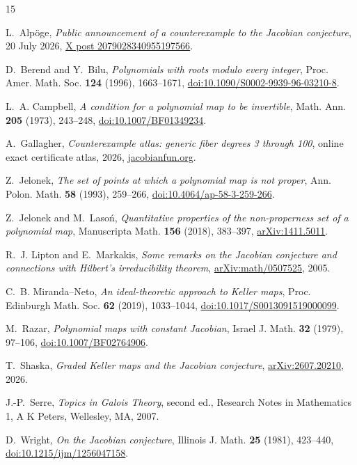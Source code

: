 \begin{thebibliography}{15}
\footnotesize
\setlength{\itemsep}{0pt}

L.~Alp\"oge,
\emph{Public announcement of a counterexample to the Jacobian conjecture},
20 July 2026,
\href{https://x.com/__alpoge__/status/2079028340955197566}
{X post 2079028340955197566}.

D.~Berend and Y.~Bilu,
\emph{Polynomials with roots modulo every integer},
Proc. Amer. Math. Soc. \textbf{124} (1996), 1663--1671,
\href{https://doi.org/10.1090/S0002-9939-96-03210-8}
{doi:10.1090/S0002-9939-96-03210-8}.

L.~A. Campbell,
\emph{A condition for a polynomial map to be invertible},
Math. Ann. \textbf{205} (1973), 243--248,
\href{https://doi.org/10.1007/BF01349234}
{doi:10.1007/BF01349234}.

A.~Gallagher,
\emph{Counterexample atlas: generic fiber degrees 3 through 100},
online exact certificate atlas, 2026,
\href{https://jacobianfun.org/counterexamples}{jacobianfun.org}.

Z.~Jelonek,
\emph{The set of points at which a polynomial map is not proper},
Ann. Polon. Math. \textbf{58} (1993), 259--266,
\href{https://doi.org/10.4064/ap-58-3-259-266}
{doi:10.4064/ap-58-3-259-266}.

Z.~Jelonek and M.~Laso\'n,
\emph{Quantitative properties of the non-properness set of a polynomial map},
Manuscripta Math. \textbf{156} (2018), 383--397,
\href{https://arxiv.org/abs/1411.5011}{arXiv:1411.5011}.

R.~J. Lipton and E.~Markakis,
\emph{Some remarks on the Jacobian conjecture and connections with
Hilbert's irreducibility theorem},
\href{https://arxiv.org/abs/math/0507525}{arXiv:math/0507525}, 2005.

C.~B. Miranda--Neto,
\emph{An ideal-theoretic approach to Keller maps},
Proc. Edinburgh Math. Soc. \textbf{62} (2019), 1033--1044,
\href{https://doi.org/10.1017/S0013091519000099}
{doi:10.1017/S0013091519000099}.

M.~Razar,
\emph{Polynomial maps with constant Jacobian},
Israel J. Math. \textbf{32} (1979), 97--106,
\href{https://doi.org/10.1007/BF02764906}
{doi:10.1007/BF02764906}.

T.~Shaska,
\emph{Graded Keller maps and the Jacobian conjecture},
\href{https://arxiv.org/abs/2607.20210}{arXiv:2607.20210}, 2026.

J.-P.~Serre,
\emph{Topics in Galois Theory},
second ed., Research Notes in Mathematics 1,
A K Peters, Wellesley, MA, 2007.

D.~Wright,
\emph{On the Jacobian conjecture},
Illinois J. Math. \textbf{25} (1981), 423--440,
\href{https://doi.org/10.1215/ijm/1256047158}
{doi:10.1215/ijm/1256047158}.

\end{thebibliography}

